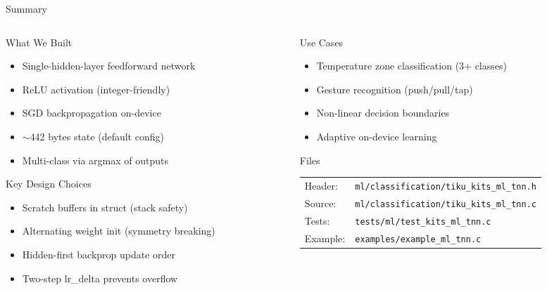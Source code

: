 \documentclass[aspectratio=169, 10pt]{beamer}
\begin{document}
\begin{frame}{Summary}
\begin{columns}[T]
\begin{column}{0.48\textwidth}
\begin{block}{What We Built}
\begin{itemize}
  \item Single-hidden-layer feedforward network
  \item ReLU activation (integer-friendly)
  \item SGD backpropagation on-device
  \item $\sim$442 bytes state (default config)
  \item Multi-class via argmax of outputs
\end{itemize}
\end{block}

\begin{block}{Key Design Choices}
\begin{itemize}
  \item Scratch buffers in struct (stack safety)
  \item Alternating weight init (symmetry breaking)
  \item Hidden-first backprop update order
  \item Two-step lr\_delta prevents overflow
\end{itemize}
\end{block}
\end{column}

\begin{column}{0.48\textwidth}
\begin{block}{Use Cases}
\begin{itemize}
  \item Temperature zone classification (3+ classes)
  \item Gesture recognition (push/pull/tap)
  \item Non-linear decision boundaries
  \item Adaptive on-device learning
\end{itemize}
\end{block}

\begin{block}{Files}
\scriptsize
\begin{tabular}{@{}lp{4.5cm}@{}}
Header: & \texttt{ml/classification/tiku\_kits\_ml\_tnn.h} \\
Source: & \texttt{ml/classification/tiku\_kits\_ml\_tnn.c} \\
Tests: & \texttt{tests/ml/test\_kits\_ml\_tnn.c} \\
Example: & \texttt{examples/example\_ml\_tnn.c} \\
\end{tabular}
\end{block}
\end{column}
\end{columns}
\end{frame}
\end{document}
